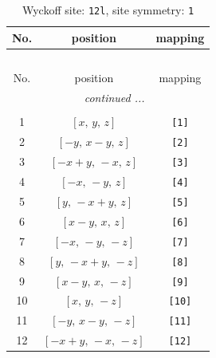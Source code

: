 \documentclass[fleqn,8pt]{jsarticle}
\begin{document}
\begin{longtable}{ccc}
\caption{Wyckoff site: {\tt 12l}, site symmetry: {\tt 1}}
 \\
 \hline \hline
No. & position & mapping \\ \hline \endfirsthead

\multicolumn{2}{l}{\tablename\ \thetable{}} \\
 \hline \hline
No. & position & mapping \\ \hline \endhead

 \hline \hline
\multicolumn{2}{r}{\footnotesize\it continued ...} \\ \endfoot

 \hline \hline
\multicolumn{2}{r}{} \\ \endlastfoot

1 & $\left[ x,\, y,\, z \right]$ & {\tt [1]} \\ \hline
2 & $\left[ - y,\, x - y,\, z \right]$ & {\tt [2]} \\ \hline
3 & $\left[ - x + y,\, - x,\, z \right]$ & {\tt [3]} \\ \hline
4 & $\left[ - x,\, - y,\, z \right]$ & {\tt [4]} \\ \hline
5 & $\left[ y,\, - x + y,\, z \right]$ & {\tt [5]} \\ \hline
6 & $\left[ x - y,\, x,\, z \right]$ & {\tt [6]} \\ \hline
7 & $\left[ - x,\, - y,\, - z \right]$ & {\tt [7]} \\ \hline
8 & $\left[ y,\, - x + y,\, - z \right]$ & {\tt [8]} \\ \hline
9 & $\left[ x - y,\, x,\, - z \right]$ & {\tt [9]} \\ \hline
10 & $\left[ x,\, y,\, - z \right]$ & {\tt [10]} \\ \hline
11 & $\left[ - y,\, x - y,\, - z \right]$ & {\tt [11]} \\ \hline
12 & $\left[ - x + y,\, - x,\, - z \right]$ & {\tt [12]} \\
\end{longtable}
\end{document}

